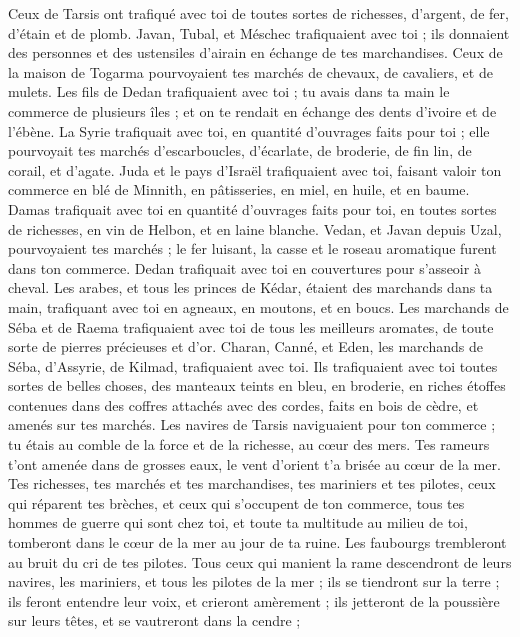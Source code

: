 \begin{multicols}{2}
Ceux de Tarsis ont trafiqué avec toi de toutes sortes de richesses, d'argent, de fer, d'étain et de plomb.
Javan, Tubal, et Méschec trafiquaient avec toi ; ils donnaient des personnes et des ustensiles d'airain en échange de tes marchandises.
Ceux de la maison de Togarma pourvoyaient tes marchés de chevaux, de cavaliers, et de mulets.
Les fils de Dedan trafiquaient avec toi ; tu avais dans ta main le commerce de plusieurs îles ; et on te rendait en échange des dents d'ivoire et de l'ébène.
La Syrie trafiquait avec toi, en quantité d'ouvrages faits pour toi ; elle pourvoyait tes marchés d'escarboucles, d'écarlate, de broderie, de fin lin, de corail, et d'agate.
Juda et le pays d'Israël trafiquaient avec toi, faisant valoir ton commerce en blé de Minnith, en pâtisseries, en miel, en huile, et en baume.
Damas trafiquait avec toi en quantité d'ouvrages faits pour toi, en toutes sortes de richesses, en vin de Helbon, et en laine blanche.
Vedan, et Javan depuis Uzal, pourvoyaient tes marchés ; le fer luisant, la casse et le roseau aromatique furent dans ton commerce.
Dedan trafiquait avec toi en couvertures pour s'asseoir à cheval.
Les arabes, et tous les princes de Kédar, étaient des marchands dans ta main, trafiquant avec toi en agneaux, en moutons, et en boucs.
Les marchands de Séba et de Raema trafiquaient avec toi de tous les meilleurs aromates, de toute sorte de pierres précieuses et d'or.
Charan, Canné, et Eden, les marchands de Séba, d'Assyrie, de Kilmad, trafiquaient avec toi.
Ils trafiquaient avec toi toutes sortes de belles choses, des manteaux teints en bleu, en broderie, en riches étoffes contenues dans des coffres attachés avec des cordes, faits en bois de cèdre, et amenés sur tes marchés.
Les navires de Tarsis naviguaient pour ton commerce ; tu étais au comble de la force et de la richesse, au cœur des mers.
Tes rameurs t'ont amenée dans de grosses eaux, le vent d'orient t'a brisée au cœur de la mer.
Tes richesses, tes marchés et tes marchandises, tes mariniers et tes pilotes, ceux qui réparent tes brèches, et ceux qui s'occupent de ton commerce, tous tes hommes de guerre qui sont chez toi, et toute ta multitude au milieu de toi, tomberont dans le cœur de la mer au jour de ta ruine.
Les faubourgs trembleront au bruit du cri de tes pilotes.
Tous ceux qui manient la rame descendront de leurs navires, les mariniers, et tous les pilotes de la mer ; ils se tiendront sur la terre ;
ils feront entendre leur voix, et crieront amèrement ; ils jetteront de la poussière sur leurs têtes, et se vautreront dans la cendre ;

\end{multicols}
